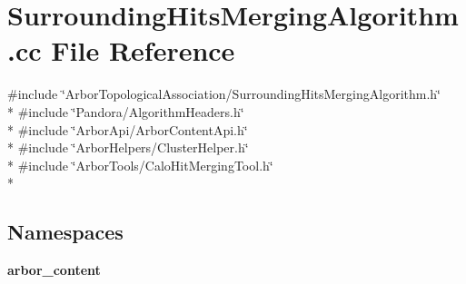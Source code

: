 \section{Surrounding\+Hits\+Merging\+Algorithm.\+cc File Reference}
\label{SurroundingHitsMergingAlgorithm_8cc}
{\ttfamily \#include \char`\"{}Arbor\+Topological\+Association/\+Surrounding\+Hits\+Merging\+Algorithm.\+h\char`\"{}}\\*
{\ttfamily \#include \char`\"{}Pandora/\+Algorithm\+Headers.\+h\char`\"{}}\\*
{\ttfamily \#include \char`\"{}Arbor\+Api/\+Arbor\+Content\+Api.\+h\char`\"{}}\\*
{\ttfamily \#include \char`\"{}Arbor\+Helpers/\+Cluster\+Helper.\+h\char`\"{}}\\*
{\ttfamily \#include \char`\"{}Arbor\+Tools/\+Calo\+Hit\+Merging\+Tool.\+h\char`\"{}}\\*
\subsection*{Namespaces}
\begin{DoxyCompactItemize}
\item 
 {\bf arbor\+\_\+content}
\end{DoxyCompactItemize}
